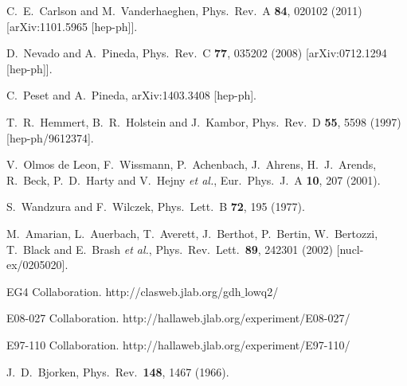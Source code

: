 \documentclass[prc,twocolumn,showpacs,preprintnumbers,amsmath,amssymb
,superscriptaddress,a4paper,nofootinbib
]{revtex4-1}
\begin{document}
\begin{thebibliography}{99}
  C.~E.~Carlson and M.~Vanderhaeghen,
  Phys.\ Rev.\ A {\bf 84}, 020102 (2011)
  [arXiv:1101.5965 [hep-ph]].
  
  D.~Nevado and A.~Pineda,
  Phys.\ Rev.\ C {\bf 77}, 035202 (2008)
  [arXiv:0712.1294 [hep-ph]].
  
  C.~Peset and A.~Pineda,
  arXiv:1403.3408 [hep-ph].
  
  T.~R.~Hemmert, B.~R.~Holstein and J.~Kambor,
  Phys.\ Rev.\ D {\bf 55}, 5598 (1997)
  [hep-ph/9612374].

V.~Olmos de Leon, F.~Wissmann, P.~Achenbach, J.~Ahrens, H.~J.~Arends, R.~Beck, P.~D.~Harty and V.~Hejny {\it et al.}, 
Eur.\ Phys.\ J.\ A {\bf 10}, 207 (2001). 


  S.~Wandzura and F.~Wilczek,
  Phys.\ Lett.\ B {\bf 72}, 195 (1977).
  
  M.~Amarian, L.~Auerbach, T.~Averett, J.~Berthot, P.~Bertin, W.~Bertozzi, T.~Black and E.~Brash {\it et al.},
  Phys.\ Rev.\ Lett.\  {\bf 89}, 242301 (2002)
  [nucl-ex/0205020].
  
EG4 Collaboration. http://clasweb.jlab.org/gdh$\_$lowq2/

E08-027 Collaboration. http://hallaweb.jlab.org/experiment/E08-027/

E97-110 Collaboration. http://hallaweb.jlab.org/experiment/E97-110/

  J.~D.~Bjorken,
  Phys.\ Rev.\  {\bf 148}, 1467 (1966).
  

\end{thebibliography}
\end{document}
